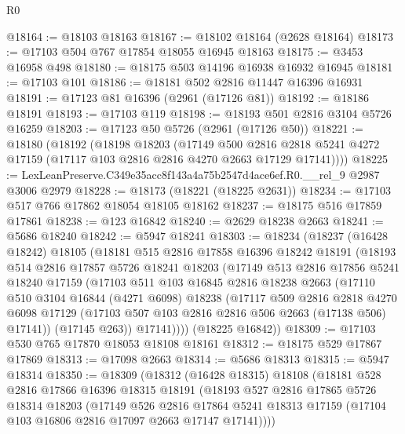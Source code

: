 \begin{lexlean}{R0}
\begin{coremodule}
@18164 := @18103 @18163
@18167 := @18102 @18164 (@2628 @18164)
@18173 := @17103 @504 @767 @17854 @18055 @16945 @18163
@18175 := @3453 @16958 @498
@18180 := @18175 @503 @14196 @16938 @16932 @16945
@18181 := @17103 @101
@18186 := @18181 @502 @2816 @11447 @16396 @16931
@18191 := @17123 @81 @16396 (@2961 (@17126 @81))
@18192 := @18186 @18191
@18193 := @17103 @119
@18198 := @18193 @501 @2816 @3104 @5726 @16259
@18203 := @17123 @50 @5726 (@2961 (@17126 @50))
@18221 := @18180
    (@18192
      (@18198
        @18203
        (@17149
          @500
          @2816
          @2818
          @5241
          @4272
          @17159
          (@17117 @103 @2816 @2816 @4270 @2663 @17129 @17141))))
@18225 := LexLeanPreserve.C349e35acc8f143a4a75b2547d4ace6ef.R0.__rel_9 @2987 @3006 @2979
@18228 := @18173 (@18221 (@18225 @2631))
@18234 := @17103 @517 @766 @17862 @18054 @18105 @18162
@18237 := @18175 @516 @17859 @17861
@18238 := @123 @16842
@18240 := @2629 @18238 @2663
@18241 := @5686 @18240
@18242 := @5947 @18241
@18303 := @18234
    (@18237
      (@16428 @18242)
      @18105
      (@18181
        @515
        @2816
        @17858
        @16396
        @18242
        @18191
        (@18193
          @514
          @2816
          @17857
          @5726
          @18241
          @18203
          (@17149
            @513
            @2816
            @17856
            @5241
            @18240
            @17159
            (@17103
              @511
              @103
              @16845
              @2816
              @18238
              @2663
              (@17110
                @510
                @3104
                @16844
                (@4271 @6098)
                @18238
                (@17117
                  @509
                  @2816
                  @2818
                  @4270
                  @6098
                  @17129
                  (@17103 @507 @103 @2816 @2816 @506 @2663 (@17138 @506) @17141))
                (@17145 @263))
              @17141))))
      (@18225 @16842))
@18309 := @17103 @530 @765 @17870 @18053 @18108 @18161
@18312 := @18175 @529 @17867 @17869
@18313 := @17098 @2663
@18314 := @5686 @18313
@18315 := @5947 @18314
@18350 := @18309
    (@18312
      (@16428 @18315)
      @18108
      (@18181
        @528
        @2816
        @17866
        @16396
        @18315
        @18191
        (@18193
          @527
          @2816
          @17865
          @5726
          @18314
          @18203
          (@17149
            @526
            @2816
            @17864
            @5241
            @18313
            @17159
            (@17104 @103 @16806 @2816 @17097 @2663 @17147 @17141))))

\end{coremodule}
\end{lexlean}
